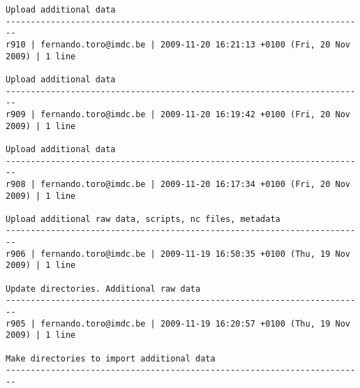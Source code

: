 \documentclass[9]{report}
\begin{document}
\begin{description}
\begin{verbatim}
Upload additional data
------------------------------------------------------------------------
r910 | fernando.toro@imdc.be | 2009-11-20 16:21:13 +0100 (Fri, 20 Nov 2009) | 1 line

Upload additional data
------------------------------------------------------------------------
r909 | fernando.toro@imdc.be | 2009-11-20 16:19:42 +0100 (Fri, 20 Nov 2009) | 1 line

Upload additional data
------------------------------------------------------------------------
r908 | fernando.toro@imdc.be | 2009-11-20 16:17:34 +0100 (Fri, 20 Nov 2009) | 1 line

Upload additional raw data, scripts, nc files, metadata
------------------------------------------------------------------------
r906 | fernando.toro@imdc.be | 2009-11-19 16:50:35 +0100 (Thu, 19 Nov 2009) | 1 line

Update directories. Additional raw data
------------------------------------------------------------------------
r905 | fernando.toro@imdc.be | 2009-11-19 16:20:57 +0100 (Thu, 19 Nov 2009) | 1 line

Make directories to import additional data
------------------------------------------------------------------------


\end{verbatim}
\end{description}
\end{document}
